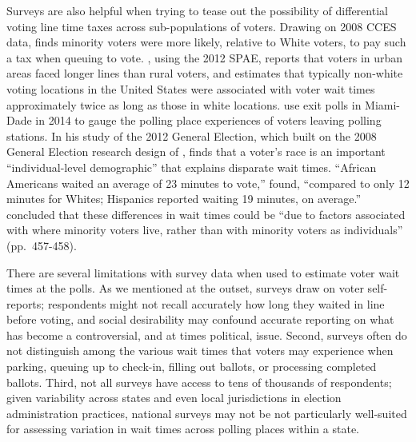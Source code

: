 \documentclass[12pt,titlepage]{article}
\begin{document}
Surveys are also helpful when trying to tease out the possibility of
differential voting line time taxes across sub-populations of voters.
Drawing on 2008 CCES data, \cite{mukherjee:timetax} finds minority
voters were more likely, relative to White voters, to pay such a tax
when queuing to vote. \citet{kimball:voting}, using the 2012 SPAE,
reports that voters in urban areas faced longer lines than rural
voters, and \citet{pettigrew:racegapwaittimes} estimates that
typically non-white voting locations in the United States were
associated with voter wait times approximately twice as long as those
in white locations.  \cite{herron:confidence} use exit polls in
Miami-Dade in 2014 to gauge the polling place experiences of voters
leaving polling stations.  In his study of the 2012 General Election,
which built on the 2008 General Election research design of
\citet{alvarez:survey}, \cite{stewart:waitingtovote2012} finds that a
voter's race is an important ``individual-level demographic'' that
explains disparate wait times.  ``African Americans waited an average
of 23 minutes to vote,'' \citeauthor{stewart:waitingtovote2012} found,
``compared to only 12 minutes for Whites; Hispanics reported waiting
19 minutes, on average.''  \citeauthor{stewart:waitingtovote2012}
concluded that these differences in wait times could be ``due to
factors associated with where minority voters live, rather than with
minority voters as individuals'' (pp.\ 457-458).

There are several limitations with survey data when used to estimate
voter wait times at the polls. As we mentioned at the outset, surveys
draw on voter self-reports; respondents might not recall accurately
how long they waited in line before voting, and social desirability
may confound accurate reporting on what has become a controversial,
and at times political, issue.  Second, surveys often do not
distinguish among the various wait times that voters may experience
when parking, queuing up to check-in, filling out ballots, or
processing completed ballots. Third, not all
surveys have access to tens of thousands of respondents; given
variability across states and even local jurisdictions in election administration practices,
national surveys may not be not particularly well-suited for assessing
variation in wait times across polling places within a state. 
\end{document}
